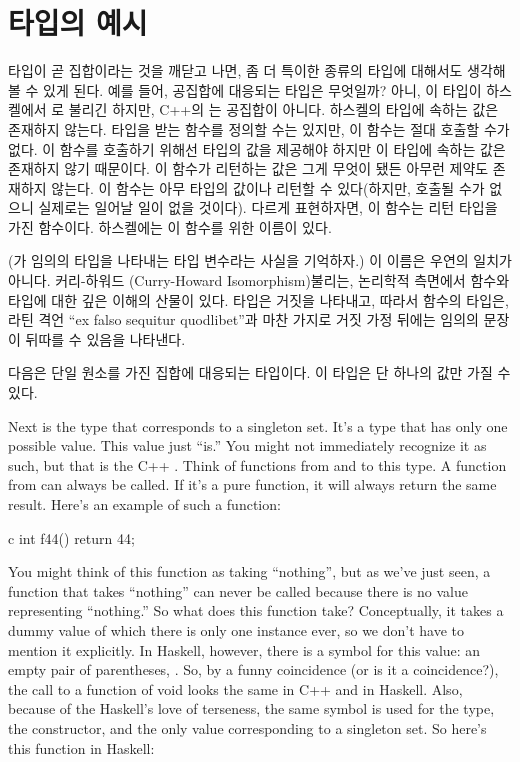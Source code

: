 \section{타입의 예시}

타입이 곧 집합이라는 것을 깨닫고 나면, 좀 더 특이한 종류의 타입에 대해서도 생각해 볼 수 있게 된다.
예를 들어, 공집합에 대응되는 타입은 무엇일까? 아니, 이 타입이 하스켈에서 로 불리긴 하지만, C++의 는 공집합이 아니다. 
하스켈의  타입에 속하는 값은 존재하지 않는다.  타입을 받는 함수를 정의할 수는 있지만, 이 함수는 절대 호출할 수가 없다.
이 함수를 호출하기 위해선  타입의 값을 제공해야 하지만 이 타입에 속하는 값은 존재하지 않기 때문이다. 
이 함수가 리턴하는 값은 그게 무엇이 됐든 아무런 제약도 존재하지 않는다. 이 함수는 아무 타입의 값이나 리턴할 수 있다(하지만, 호출될 수가 없으니 실제로는 일어날 일이 없을 것이다).
다르게 표현하자면, 이 함수는 \trPolymorphic 리턴 타입을 가진 함수이다. 하스켈에는 이 함수를 위한 이름이 있다.


(가 임의의 타입을 나타내는 타입 변수라는 사실을 기억하자.)
이 이름은 우연의 일치가 아니다. 커리-하워드 \trIsomorphism(Curry-Howard Isomorphism) 불리는, 논리학적 측면에서 함수와 타입에 대한 깊은 이해의 산물이 있다.
 타입은 거짓을 나타내고, 따라서  함수의 타입은, 라틴 격언 ``ex falso sequitur quodlibet''과 마찬 가지로 거짓 가정 뒤에는 임의의 문장이 뒤따를 수 있음을 나타낸다.

다음은 단일 원소를 가진 집합에 대응되는 타입이다. 이 타입은 단 하나의 값만 가질 수 있다.

Next is the type that corresponds to a singleton set. It's a type that
has only one possible value. This value just ``is.'' You might not
immediately recognize it as such, but that is the C++ .
Think of functions from and to this type. A function from 
can always be called. If it's a pure function, it will always return the
same result. Here's an example of such a function:

\begin{snip}{c}
int f44() { return 44; }
\end{snip}
You might think of this function as taking ``nothing'', but as we've
just seen, a function that takes ``nothing'' can never be called because
there is no value representing ``nothing.'' So what does this function
take? Conceptually, it takes a dummy value of which there is only one
instance ever, so we don't have to mention it explicitly. In Haskell,
however, there is a symbol for this value: an empty pair of parentheses,
\code{()}. So, by a funny coincidence (or is it a coincidence?), the
call to a function of void looks the same in C++ and in Haskell. Also,
because of the Haskell's love of terseness, the same symbol \code{()}
is used for the type, the constructor, and the only value corresponding
to a singleton set. So here's this function in Haskell:

